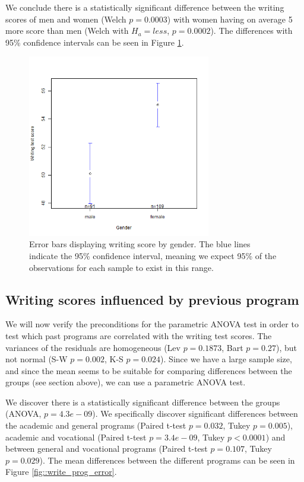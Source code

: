 \documentclass[10pt, a4paper]{article}
\begin{document}
	We conclude there is a statistically significant difference between the writing scores of men and women (Welch $p = 0.0003$) with women having on average 5 more score than men (Welch with $H_a = less$, $p = 0.0002$). The differences with 95\% confidence intervals can be seen in Figure \ref{fig::write_gender_error}.
	
	\begin{figure}
		\includegraphics[width=8cm]{writing_gender_error_plot.png}
		\centering
		\caption{Error bars displaying writing score by gender. The blue lines indicate the 95\% confidence interval, meaning we expect 95\% of the observations for each sample to exist in this range.}
		\label{fig::write_gender_error}
	\end{figure}
	
	
	\subsection{Writing scores influenced by previous program}
	We will now verify the preconditions for the parametric ANOVA test in order to test which past programs are correlated with the writing test scores. The variances of the residuals are homogeneous (Lev $p = 0.1873$, Bart $p = 0.27$), but not normal (S-W $p = 0.002$, K-S $p=0.024$). Since we have a large sample size, and since the mean seems to be suitable for comparing differences between the groups (see section above), we can use a parametric ANOVA test.
	
	We discover there is a statistically significant difference between the groups (ANOVA, $p=4.3e-09$). We specifically discover significant differences between the academic and general programs (Paired t-test $p=0.032$, Tukey $p=0.005$), academic and vocational (Paired t-test $p=3.4e-09$, Tukey $p<0.0001$) and between general and vocational programs (Paired t-test $p=0.107$, Tukey $p=0.029$). The mean differences between the different programs can be seen in Figure \ref{fig::write_prog_error}.
	
\end{document}

